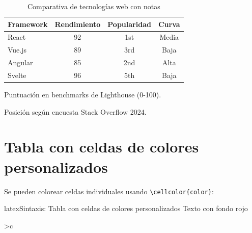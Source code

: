 \begin{table}[htbp]
  \centering
  \caption{Comparativa de tecnologías web con notas}
  \label{tab:tecnologias-notas}
  \begin{threeparttable}
    \EPScabeceraTabla
    \begin{tabular}{@{}lccc@{}}
      \toprule
      \textbf{Framework} & \textbf{Rendimiento}\tnote{a} & \textbf{Popularidad}\tnote{b} & \textbf{Curva} \\
      \midrule
      React     & 92 & 1st  & Media \\
      Vue.js    & 89 & 3rd  & Baja \\
      Angular   & 85 & 2nd  & Alta \\
      Svelte    & 96 & 5th  & Baja \\
      \bottomrule
    \end{tabular}
    \begin{tablenotes}
      \footnotesize
      \item[a] Puntuación en benchmarks de Lighthouse (0-100).
      \item[b] Posición según encuesta Stack Overflow 2024.
    \end{tablenotes}
  \end{threeparttable}
\end{table}

\section{Tabla con celdas de colores personalizados}
\label{sec:tablas-colores}

Se pueden colorear celdas individuales usando \verb|\cellcolor{color}|:

\begin{codigosimple}{latex}{Sintaxis: Tabla con celdas de colores personalizados}
 Texto con fondo rojo


>{}c
\end{codigosimple}

